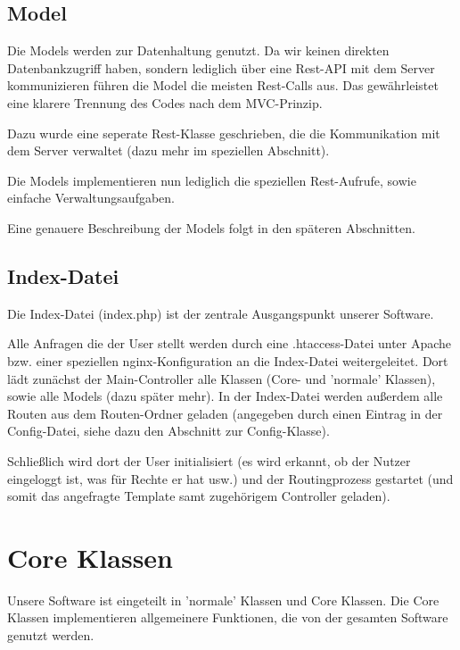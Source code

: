 \subsection{Model}

Die Models werden zur Datenhaltung genutzt. Da wir keinen direkten Datenbankzugriff haben, sondern lediglich über eine Rest-API mit dem Server kommunizieren führen die Model die meisten Rest-Calls aus. Das gewährleistet eine klarere Trennung des Codes nach dem MVC-Prinzip.

\pm

Dazu wurde eine seperate Rest-Klasse geschrieben, die die Kommunikation mit dem Server verwaltet (dazu mehr im speziellen Abschnitt).

\pm

Die Models implementieren nun lediglich die speziellen Rest-Aufrufe, sowie einfache Verwaltungsaufgaben.

\pm

Eine genauere Beschreibung der Models folgt in den späteren Abschnitten.

\subsection{Index-Datei}

Die Index-Datei (index.php) ist der zentrale Ausgangspunkt unserer Software.

\pm

Alle Anfragen die der User stellt werden durch eine .htaccess-Datei unter Apache bzw. einer speziellen nginx-Konfiguration an die Index-Datei weitergeleitet. Dort lädt zunächst der Main-Controller alle Klassen (Core- und 'normale' Klassen), sowie alle Models (dazu später mehr). In der Index-Datei werden außerdem alle Routen aus dem Routen-Ordner geladen (angegeben durch einen Eintrag in der Config-Datei, siehe dazu den Abschnitt zur Config-Klasse).

\pm

Schließlich wird dort der User initialisiert (es wird erkannt, ob der Nutzer eingeloggt ist, was für Rechte er hat usw.) und der Routingprozess gestartet (und somit das angefragte Template samt zugehörigem Controller geladen). 
\section{Core Klassen}

Unsere Software ist eingeteilt in 'normale' Klassen und Core Klassen. Die Core Klassen implementieren allgemeinere Funktionen, die von der gesamten Software genutzt werden.

